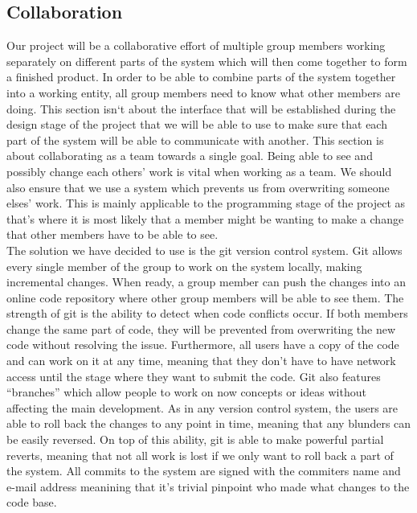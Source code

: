 \documentclass[10pt,a4paper,oneside]{report}
\begin{document}
\subsection*{Collaboration}

Our project will be a collaborative effort of multiple group members working separately on different parts of the system which will then come together to form a finished product. In order to be able to combine parts of the system together into a working entity, all group members need to know what other members are doing. This section isn`t about the interface that will be established during the design stage of the project that we will be able to use to make sure that each part of the system will be able to communicate with another. This section is about collaborating as a team towards a single goal. Being able to see and possibly change each others' work is vital when working as a team. We should also ensure that we use a system which prevents us from overwriting someone elses' work. This is mainly applicable to the programming stage of the project as that's where it is most likely that a member might be wanting to make a change that other members have to be able to see. \\


The solution we have decided to use is the git version control system. Git allows every single member of the group to work on the system locally, making incremental changes. When ready, a group member can push the changes into an online code repository where other group members will be able to see them. The strength of git is the ability to detect when code conflicts occur. If both members change the same part of code, they will be prevented from overwriting the new code without resolving the issue. Furthermore, all users have a copy of the code and can work on it at any time, meaning that they don't have to have network access until the stage where they want to submit the code. Git also features ``branches'' which allow people to work on now concepts or ideas without affecting the main development. As in any version control system, the users are able to roll back the changes to any point in time, meaning that any blunders can be easily reversed. On top of this ability, git is able to make powerful partial reverts, meaning that not all work is lost if we only want to roll back a part of the system. All commits to the system are signed with the commiters name and e-mail address meanining that it's trivial pinpoint who made what changes to the code base.\\
\end{document}
